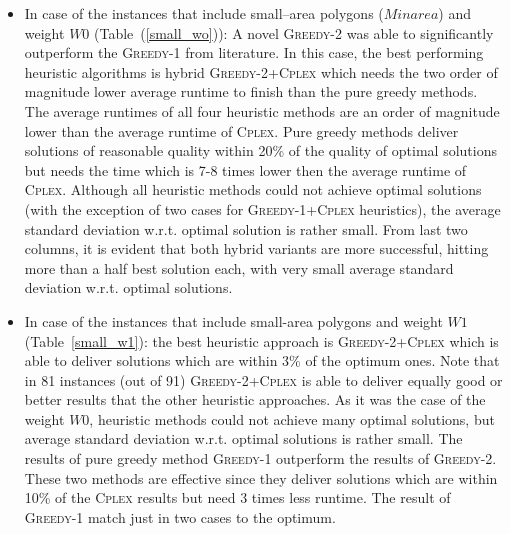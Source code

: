 \documentclass[runningheads,a4paper]{elsarticle}
\begin{document}
     \begin{itemize}
     	\item  In case of the instances that include small--area polygons ($Minarea$) and weight $W0$ (Table~(\ref{small_wo})): A novel \textsc{Greedy-2} was able to significantly outperform the \textsc{Greedy-1} from literature. In this case, the best performing heuristic algorithms is hybrid \textsc{Greedy-2+Cplex} which needs the two order of magnitude lower average runtime to finish than the pure greedy methods. The average runtimes of all four heuristic methods are an order of magnitude lower than the average runtime of \textsc{Cplex}. Pure greedy methods deliver solutions of reasonable quality within 20\% of the quality of optimal solutions but needs the time which is 7-8 times lower then the average runtime of \textsc{Cplex}. Although all heuristic methods could not achieve optimal solutions (with the exception of two cases for \textsc{Greedy-1+Cplex} heuristics), the average standard deviation w.r.t. optimal solution is rather small. From last two columns, it is evident that both hybrid variants are more successful, hitting more than a half best solution each, with very small average standard deviation w.r.t. optimal solutions.
     	\item  In case of the instances that include small-area polygons and weight $W1$ (Table~\ref{small_w1}): the best heuristic approach is \textsc{Greedy-2+Cplex} which is able to deliver solutions which are within 3\% of the optimum ones. Note that in 81 instances (out of 91) \textsc{Greedy-2+Cplex} is able to deliver equally good or better results that the other heuristic approaches. As it was the case  of the weight $W0$, heuristic methods could not achieve many optimal solutions, but average standard deviation w.r.t. optimal solutions is rather small.
     	The results of pure greedy method \textsc{Greedy-1} outperform the results of \textsc{Greedy-2}. These two methods are effective since they deliver solutions which are within 10\% of the \textsc{Cplex} results but need 3 times less runtime. The result of \textsc{Greedy-1} match just in two cases to the optimum.
     	

\end{itemize}
\end{document}
